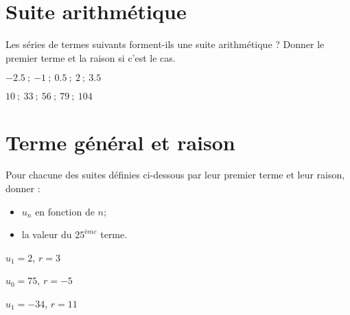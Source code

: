	\section{Suite arithmétique}
	Les séries de termes suivants forment-ils une suite arithmétique ? Donner le premier terme et la raison si c'est le cas.
	\begin{questions}
		
	
		\question[2] $\num{-2.5} \: ; \: \num{-1} \: ; \: \num{0.5}  \: ; \:  \num{2} \: ; \: \num{3.5}$ 
		\fillwithdottedlines{3.5cm}
		
		\question[2] $\num{10} \: ; \:  \num{33} \: ; \: \num{56} \: ; \: \num{79} \: ; \: \num{104}$ 
		\fillwithdottedlines{3.5cm}
		
	\end{questions}
	
	
\section{Terme général et raison}

Pour chacune des suites définies ci-dessous par leur premier terme et leur raison, donner :
\begin{itemize}
	\item $u_n$ en fonction de $n$;
	\item la valeur du $25^{ème}$ terme.
\end{itemize} 
\begin{questions}

	
	\question[2] $u_1 = 2$, $r= 3$
	
	\fillwithdottedlines{6cm}
	
	
	\question[2] $u_0 = 75$, $r= -5$
	
	\fillwithdottedlines{6cm}
	
	\question[2] $u_1 = -34$, $r=11$
	
	\fillwithdottedlines{6cm}
\end{questions}

